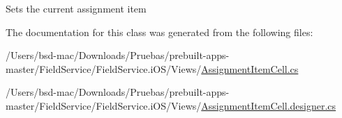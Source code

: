 Sets the current assignment item 



The documentation for this class was generated from the following files\+:\begin{DoxyCompactItemize}
\item 
/\+Users/bsd-\/mac/\+Downloads/\+Pruebas/prebuilt-\/apps-\/master/\+Field\+Service/\+Field\+Service.\+i\+O\+S/\+Views/\hyperlink{_assignment_item_cell_8cs}{Assignment\+Item\+Cell.\+cs}\item 
/\+Users/bsd-\/mac/\+Downloads/\+Pruebas/prebuilt-\/apps-\/master/\+Field\+Service/\+Field\+Service.\+i\+O\+S/\+Views/\hyperlink{_assignment_item_cell_8designer_8cs}{Assignment\+Item\+Cell.\+designer.\+cs}\end{DoxyCompactItemize}

